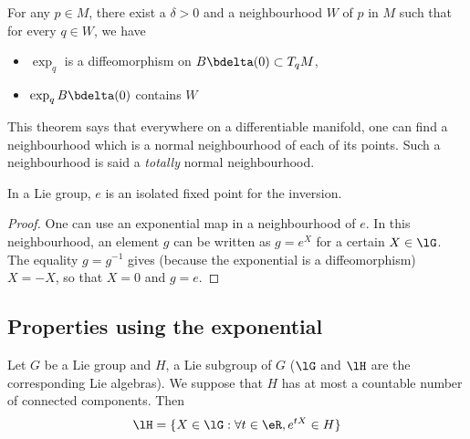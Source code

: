 \begin{theorem}
For any $p\in M$, there exist a $\delta>0$ and a neighbourhood $W$ of $p$ in $M$ such that for every $q\in W$, we have

\begin{itemize}
\item $\exp_q$ is a diffeomorphism on $B\bdelta(0)\subset T_qM$,
\item $\exp_q B\bdelta(0)$ contains $W$
\end{itemize}
\end{theorem}
This theorem says that everywhere on a differentiable manifold, one can find a neighbourhood which is a normal neighbourhood of each of its points. Such a neighbourhood is said a \emph{totally} normal neighbourhood.

\begin{lemma}
In a Lie group, $e$ is an isolated fixed point for the inversion.
\end{lemma}

\begin{proof}
One can use an exponential map in a neighbourhood of $e$. In this neighbourhood, an element $g$ can be written as $g=e^X$ for a certain $X\in\lG$. The equality $g=g^{-1}$ gives (because the exponential is a diffeomorphism) $X=-X$, so that $X=0$ and $g=e$.
\end{proof}

\subsection{Properties using the exponential}


\begin{proposition}
Let $G$ be a Lie group and $H$, a Lie subgroup of $G$ ($\lG$ and $\lH$ are the corresponding Lie algebras). We suppose that $H$ has at most a countable number of connected components. Then
\begin{equation}
  \lH=\{ X\in\lG:\forall t\in\eR,e^{tX}\in H \}
\end{equation}
\end{proposition}

